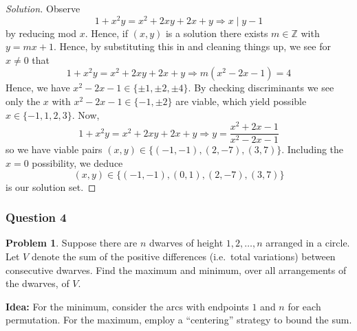 \documentclass[11pt]{article}
\theoremstyle{definition}
\newtheorem*{problem}{Problem}
\begin{document}
\begin{proof}[Solution]
  Observe
  \[1 + x^2 y = x^2 + 2xy + 2x + y \Longrightarrow x \; {\Big |} \; y - 1\]
  by reducing mod $x$. Hence, if $(x, y)$ is a solution there exists $m \in \mathbb{Z}$ with $y = mx + 1$. Hence, 
  by substituting this in and cleaning things up, we see for $x \neq 0$ that
  \[1 + x^2 y = x^2 + 2xy + 2x + y \Longrightarrow m(x^2 - 2x - 1) = 4\]
  Hence, we have $x^2 - 2x - 1 \in \{\pm 1, \pm 2, \pm 4\}$. By checking discriminants we see only the $x$ with
  $x^2 - 2x - 1 \in \{-1, \pm 2\}$ are viable, which yield possible $x \in \{-1, 1, 2, 3\}$. Now, 
  \[1 + x^2 y = x^2 + 2xy + 2x + y \Longrightarrow y = \frac{x^2 + 2x - 1}{x^2 - 2x - 1}\] 
  so we have viable pairs $(x, y) \in \{(-1, -1), (2, -7), (3, 7)\}$. Including the $x = 0$ possibility, we 
  deduce \[(x, y) \in \{(-1, -1), (0, 1), (2, -7), (3, 7)\}\] is our solution set.
\end{proof}

\newpage 

\subsubsection{Question 4}

\begin{problem}
  Suppose there are $n$ dwarves of height $1, 2, \dots, n$ arranged in a circle. Let $V$ denote the sum of the 
  positive differences (i.e.~total variations) between consecutive dwarves. Find the maximum and minimum, 
  over all arrangements of the dwarves, of $V$. 
\end{problem}

{\bf Idea:} For the minimum, consider the arcs with endpoints $1$ and $n$ for each permutation. For the maximum, 
employ a ``centering'' strategy to bound the sum.
\end{document}
